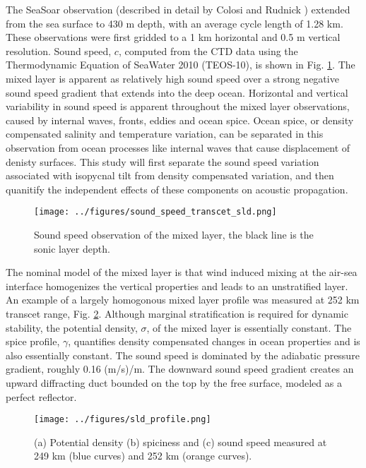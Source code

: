 \documentclass[preprint,NumberedRefs]{JASA}
\begin{document}
The SeaSoar observation (described in detail by Colosi and Rudnick \citep{colosi2020observations}) extended from the sea surface to 430 m depth, with an average cycle length of 1.28 km. These observations were first gridded to a 1 km horizontal and 0.5 m vertical resolution. Sound speed, $c$, computed from the CTD data using the Thermodynamic Equation of SeaWater 2010 (TEOS-10), is shown in Fig. \ref{fig:c_grid}. The mixed layer is apparent as relatively high sound speed over a strong negative sound speed gradient that extends into the deep ocean. Horizontal and vertical variability in sound speed is apparent throughout the mixed layer observations, caused by internal waves, fronts, eddies and ocean spice\citep{colosi2020observations}. Ocean spice, or density compensated salinity and temperature variation, can be separated in this observation from ocean processes like internal waves that cause displacement of denisty surfaces\citep{dzieciuch2004}. This study will first separate the sound speed variation associated with isopycnal tilt from density compensated variation, and then quanitify the independent effects of these components on acoustic propagation.

\begin{figure}
\texttt{[image: ../figures/sound\_speed\_transcet\_sld.png]}
\caption{\label{fig:c_grid}{Sound speed observation of the mixed layer, the black line is the sonic layer depth.}}
\end{figure}

The nominal model of the mixed layer is that wind induced mixing at the air-sea interface homogenizes the vertical properties and leads to an unstratified layer. An example of a largely homogonous mixed layer profile was measured at 252 km transcet range, Fig. \ref{fig:profiles}. Although marginal stratification is required for dynamic stability, the potential density, $\sigma$, of the mixed layer is essentially constant. The spice profile, $\gamma$, quantifies density compensated changes in ocean properties and is also essentially constant. The sound speed is dominated by the adiabatic pressure gradient, roughly 0.16 (m/s)/m. The downward sound speed gradient creates an upward diffracting duct bounded on the top by the free surface, modeled as a perfect reflector.

\begin{figure}
\texttt{[image: ../figures/sld\_profile.png]}
    \caption{\label{fig:profiles}{(a) Potential density (b) spiciness and (c) sound speed measured at 249 km (blue curves) and 252 km (orange curves).}}
\end{figure}
\end{document}
